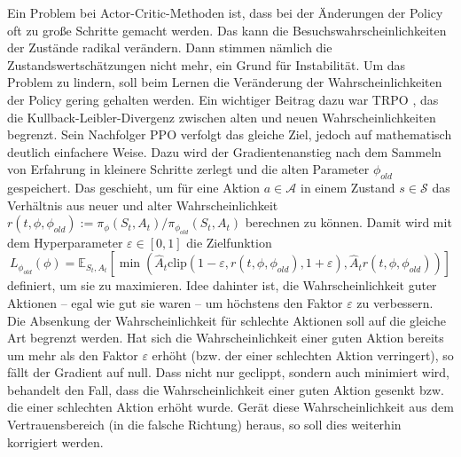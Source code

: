 Ein Problem bei Actor-Critic-Methoden ist, dass bei der Änderungen der Policy oft zu große Schritte gemacht werden.
Das kann die Besuchswahrscheinlichkeiten der Zustände radikal verändern.
Dann stimmen nämlich die Zustandswertschätzungen nicht mehr, ein Grund für Instabilität.
Um das Problem zu lindern, soll beim Lernen die Veränderung der Wahrscheinlichkeiten der Policy gering gehalten werden.
Ein wichtiger Beitrag dazu war TRPO \cite{trpo2015}, das die Kullback-Leibler-Divergenz zwischen alten und neuen Wahrscheinlichkeiten begrenzt.
Sein Nachfolger PPO \cite{ppo2018} verfolgt das gleiche Ziel, jedoch auf mathematisch deutlich einfachere Weise. 
Dazu wird der Gradientenanstieg nach dem Sammeln von Erfahrung in kleinere Schritte zerlegt und die alten Parameter $\phi_{old}$ gespeichert.
Das geschieht, um für eine Aktion $a \in \mathcal{A}$ in einem Zustand $s \in \mathcal{S}$ das Verhältnis aus neuer und alter Wahrscheinlichkeit $r(t, \phi, \phi_{old}) := \pi_\phi(S_t, A_t) / \pi_{\phi_{old}}(S_t, A_t)$ berechnen zu können.
Damit wird mit dem Hyperparameter $\varepsilon \in [0, 1]$ die Zielfunktion
\begin{equation}
	L_{\phi_{old}}(\phi) = \mathbb{E}_{S_t, A_t}\left[\min{\left(\hat{A}_t \text{clip}{\left(1 - \varepsilon, r(t, \phi, \phi_{old}), 1 + \varepsilon\right)}, \hat{A}_t r(t, \phi, \phi_{old})\right)}\right]
\end{equation}
definiert, um sie zu maximieren.
Idee dahinter ist, die Wahrscheinlichkeit guter Aktionen -- egal wie gut sie waren -- um höchstens den Faktor $\varepsilon$ zu verbessern.
Die Absenkung der Wahrscheinlichkeit für schlechte Aktionen soll auf die gleiche Art begrenzt werden.
Hat sich die Wahrscheinlichkeit einer guten Aktion bereits um mehr als den Faktor $\varepsilon$ erhöht (bzw. der einer schlechten Aktion verringert), so fällt der Gradient auf null.
Dass nicht nur geclippt, sondern auch minimiert wird, behandelt den Fall, dass die Wahrscheinlichkeit einer guten Aktion gesenkt bzw. die einer schlechten Aktion erhöht wurde.
Gerät diese Wahrscheinlichkeit aus dem Vertrauensbereich (in die falsche Richtung) heraus, so soll dies weiterhin korrigiert werden.

